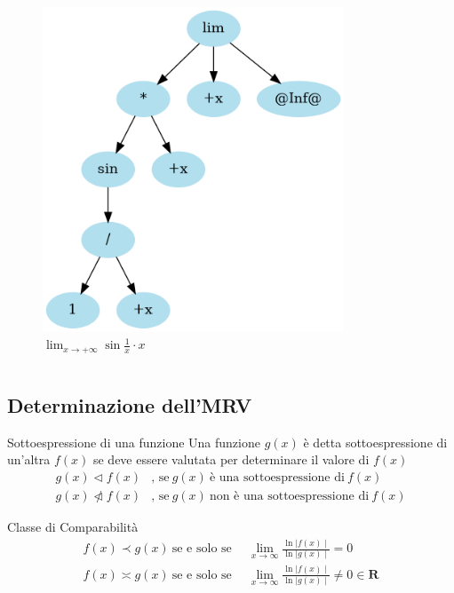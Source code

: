 \documentclass[aspectratio=149]{beamer}
\begin{document}
\begin{frame}
\begin{columns}
\begin{column}{0.45\textwidth}
\begin{figure}
					\includegraphics[width=0.8\textwidth]{pres_img/prima_semplif.png}
					\caption{\(\lim_{x \to +\infty}{\sin{\frac{1}{x}} \cdot x}\)}
				\end{figure}
			\end{column}
		\end{columns}
	\end{frame}

	\subsection{Determinazione dell'MRV}
	
	\begin{frame}
		\begin{block}{Sottoespressione di una funzione}
			Una funzione \(g(x)\) è detta sottoespressione di un'altra \(f(x)\) se deve essere valutata per determinare il valore di \(f(x)\)
			\[
			\begin{aligned}
				g(x) \triangleleft f(x)&\text{, se} \: g(x) \: \text{è una sottoespressione di} \: f(x) \\
				g(x) \ntriangleleft f(x)&\text{, se} \: g(x) \: \text{non è una sottoespressione di} \: f(x)
			\end{aligned}
			\]
		\end{block}
		\begin{block}{Classe di Comparabilità}
			\[
			\begin{aligned}
				f(x) \prec g(x) \: \text{se e solo se} \enspace &\lim_{x \to \infty}{\frac{\ln{\mid f(x)\mid}}{\ln{\mid g(x)\mid}}} = 0 \\ 
				f(x) \asymp g(x) \: \text{se e solo se} \enspace &\lim_{x \to \infty}{\frac{\ln{\mid f(x)\mid}}{\ln{\mid g(x)\mid}}} \neq 0 \in \mathbf{R}
			\end{aligned}
			\] 
		\end{block}
	\end{frame}
\end{document}
